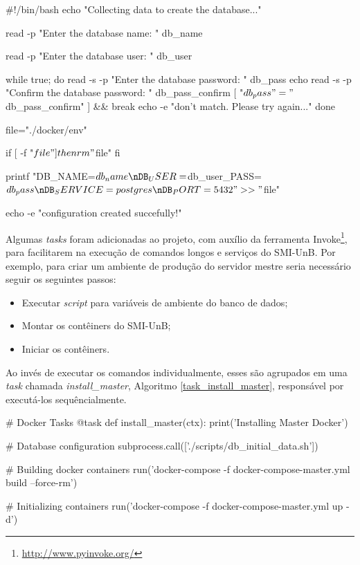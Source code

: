 \begin{python}[caption={\textit{Script} \textit{db\_initial\_data.sh}.}, captionpos=b, label={script_postgres}]
#!/bin/bash
echo "Collecting data to create the database..."

read -p "Enter the database name: " db_name

read -p "Enter the database user: " db_user

while true; do
    read -s -p "Enter the database password: " db_pass
    echo
    read -s -p "Confirm the database password: " db_pass_confirm
    [ "$db_pass" = "$db_pass_confirm" ] && break
    echo -e "\nPasswords don't match. Please try again...\n"
done

file="./docker/env"

if [ -f "$file" ]
then
    rm "$file"
fi

printf "DB_NAME=$db_name\nDB_USER=$db_user\nDB_PASS=$db_pass
        \nDB_SERVICE=postgres\nDB_PORT=5432" >> "$file"

echo -e "\nDatabase configuration created succefully!"
\end{python}

Algumas \textit{tasks} foram adicionadas ao projeto, com auxílio da ferramenta Invoke\footnote{\url{http://www.pyinvoke.org/}}, para facilitarem na execução de comandos longos e serviços do SMI-UnB. Por exemplo, para criar um ambiente de produção do servidor mestre seria necessário seguir os seguintes passos:

\begin{itemize}
    \item Executar \textit{script} para variáveis de ambiente do banco de dados;
    \item Montar os contêiners do SMI-UnB;
    \item Iniciar os contêiners.
\end{itemize}

Ao invés de executar os comandos individualmente, esses são agrupados em uma \textit{task} chamada \textit{install\_master}, Algoritmo \ref{task_install_master}, responsável por executá-los sequêncialmente.

\begin{python}[caption={\textit{Task} \textit{install\_master}, presente no arquivo \textit{tasks.py}.}, captionpos=b, label={task_install_master}]
# Docker Tasks
@task
def install_master(ctx):
    print('Installing Master Docker')

    # Database configuration
    subprocess.call(['./scripts/db_initial_data.sh'])

    # Building docker containers
    run('docker-compose -f docker-compose-master.yml build
         --force-rm')

    # Initializing containers
    run('docker-compose -f docker-compose-master.yml up -d')
\end{python}

